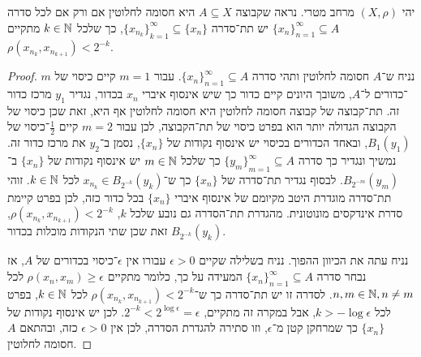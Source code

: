 \question{}
יהי $(X, \rho)$ מרחב מטרי.
נראה שקבוצה $A \subseteq X$ היא חסומה לחלוטין אם ורק אם לכל סדרה ${\{ x_n \}}_{n = 1}^\infty \subseteq A$ יש תת־סדרה ${\{ x_{n_k} \}}_{k = 1}^\infty \subseteq \{ x_n \}$,
כך שלכל $k \in \mathbb{N}$ מתקיים $\rho(x_{n_k}, x_{n_{k + 1}}) < 2^{-k}$.
\begin{proof}
	נניח ש־$A$ חסומה לחלוטין ותהי סדרה ${\{ x_n \}}_{n = 1}^\infty \subseteq A$.
	עבור $m = 1$ קיים כיסוי של $m$־כדורים ל־$A$, משובך היונים קיים כדור כך שיש אינסוף איברי $x_n$ בכדור, נגדיר $y_1$ מרכז כדור זה.
	תת־קבוצה של קבוצה חסומה לחלוטין היא חסומה לחלוטין אף היא, זאת שכן כיסוי של הקבוצה הגדולה יותר הוא בפרט כיסוי של תת־הקבוצה,
	לכן עבור $m = 2$ קיים $\frac{1}{2}$־כיסוי של $B_1(y_1)$, ובאחד הכדורים בכיסוי יש אינסוף נקודות של $\{x_n\}$, נסמן ב־$y_2$ את מרכז כדור זה.
	נמשיך ונגדיר כך סדרה ${\{ y_m \}}_{m = 1}^\infty \subseteq A$ כך שלכל $m \in \mathbb{N}$ יש אינסוף נקודות של $\{ x_n \}$ ב־$B_{2^{-m}}(y_m)$.
	לבסוף נגדיר תת־סדרה של $\{x_n\}$ כך ש־$x_{n_k} \in B_{2^{-k}}(y_k)$ לכל $k \in \mathbb{N}$.
	זוהי תת־סדרה מוגדרת היטב מקיומם של אינסוף איברי $\{x_n\}$ בכל כדור כזה, לכן בפרט קיימת סדרת אינדקסים מונוטונית.
	מהגדרת תת־הסדרה גם נובע שלכל $k$, $\rho(x_{n_k}, x_{n_{k + 1}}) < 2^{-k}$, זאת שכן שתי הנקודות מוכלות בכדור $B_{2^{-k}}(y_k)$.

	נניח עתה את הכיוון ההפוך.
	נניח בשלילה שקיים $\epsilon > 0$ עבורו אין $\epsilon$־כיסוי בכדורים של $A$, אז נבחר סדרה ${\{ x_n \}}_{n = 1}^\infty \subseteq A$ המעידה על כך, כלומר מתקיים $\rho(x_n, x_m) \ge \epsilon$ לכל $n, m \in \mathbb{N}, n \ne m$.
	לסדרה זו יש תת־סדרה כך ש־$\rho(x_{n_k}, x_{n_{k + 1}}) < 2^{-k}$ לכל $k \in \mathbb{N}$, בפרט לכל $k > - \log \epsilon$, אבל במקרה זה מתקיים, $2^{-k} < 2^{\log \epsilon} = \epsilon$.
	לכן יש אינסוף נקודות של $\{ x_n \}$ כך שמרחקן קטן מ־$\epsilon$, וזו סתירה להגדרת הסדרה, לכן אין $\epsilon > 0$ כזה, ובהתאם $A$ חסומה לחלוטין.
\end{proof}

